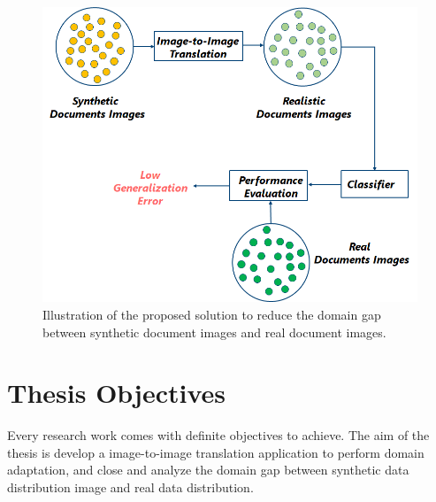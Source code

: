 \begin{figure}[H]
        \begin{center}
	    \includegraphics[scale=0.55]{images/Introduction/ProposedSolution.png}
	    \caption[Illustration of the proposed solution to reduce the domain gap between synthetic document images and real document images.]{Illustration of the proposed solution to reduce the domain gap between synthetic document images and real document images.}
	    \label{fig:ProposedSolution}
	    \end{center}
\end{figure}



\section{Thesis Objectives}\label{thesisobjectives}
Every research work comes with definite objectives to achieve. The aim of the thesis is develop a image-to-image translation application to perform domain adaptation, and close and analyze the domain gap between synthetic data distribution image and real data distribution.

